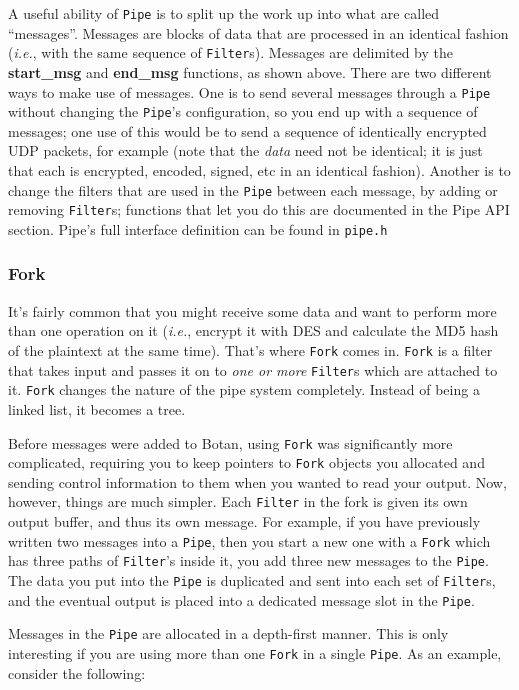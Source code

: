 \documentclass{article}
\newcommand{\filename}[1]{\texttt{#1}}
\newcommand{\function}[1]{\textbf{#1}}
\newcommand{\type}[1]{\texttt{#1}}
\newcommand{\ie}[0]{\emph{i.e.}}
\begin{document}
A useful ability of \type{Pipe} is to split up the work up into what are called
``messages''. Messages are blocks of data that are processed in an identical
fashion (\ie, with the same sequence of \type{Filter}s). Messages are delimited
by the \function{start\_msg} and \function{end\_msg} functions, as shown
above. There are two different ways to make use of messages. One is to send
several messages through a \type{Pipe} without changing the \type{Pipe}'s
configuration, so you end up with a sequence of messages; one use of this would
be to send a sequence of identically encrypted UDP packets, for example (note
that the \emph{data} need not be identical; it is just that each is encrypted,
encoded, signed, etc in an identical fashion). Another is to change the filters
that are used in the \type{Pipe} between each message, by adding or removing
\type{Filter}s; functions that let you do this are documented in the Pipe API
section. Pipe's full interface definition can be found in \filename{pipe.h}

\subsubsection{Fork}

It's fairly common that you might receive some data and want to perform more
than one operation on it (\ie, encrypt it with DES and calculate the MD5 hash
of the plaintext at the same time). That's where \type{Fork} comes
in. \type{Fork} is a filter that takes input and passes it on to \emph{one or
more} \type{Filter}s which are attached to it. \type{Fork} changes the nature
of the pipe system completely. Instead of being a linked list, it becomes a
tree.

Before messages were added to Botan, using \type{Fork} was significantly more
complicated, requiring you to keep pointers to \type{Fork} objects you
allocated and sending control information to them when you wanted to read your
output. Now, however, things are much simpler. Each \type{Filter} in the fork
is given its own output buffer, and thus its own message. For example, if you
have previously written two messages into a \type{Pipe}, then you start a new
one with a \type{Fork} which has three paths of \type{Filter}'s inside it, you
add three new messages to the \type{Pipe}. The data you put into the
\type{Pipe} is duplicated and sent into each set of \type{Filter}s, and the
eventual output is placed into a dedicated message slot in the \type{Pipe}.

Messages in the \type{Pipe} are allocated in a depth-first manner. This is only
interesting if you are using more than one \type{Fork} in a single \type{Pipe}.
As an example, consider the following:
\end{document}
